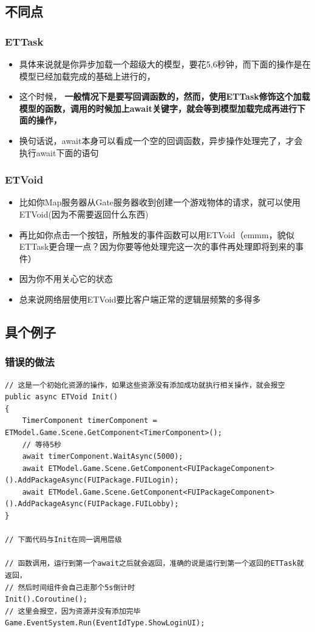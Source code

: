 \documentclass[9pt, b5paper]{article}
\begin{document}
\subsection{不同点}
\label{sec-5-2}
\subsubsection{ETTask}
\label{sec-5-2-1}
\begin{itemize}
\item 具体来说就是你异步加载一个超级大的模型，要花5,6秒钟，而下面的操作是在模型已经加载完成的基础上进行的，
\item 这个时候， \textbf{一般情况下是要写回调函数的，然而，使用ETTask修饰这个加载模型的函数，调用的时候加上await关键字，就会等到模型加载完成再进行下面的操作，}
\item 换句话说，await本身可以看成一个空的回调函数，异步操作处理完了，才会执行await下面的语句
\end{itemize}
\subsubsection{ETVoid}
\label{sec-5-2-2}
\begin{itemize}
\item 比如你Map服务器从Gate服务器收到创建一个游戏物体的请求，就可以使用ETVoid(因为不需要返回什么东西)
\item 再比如你点击一个按钮，所触发的事件函数可以用ETVoid（emmm，貌似ETTask更合理一点？因为你要等他处理完这一次的事件再处理即将到来的事件）
\item 因为你不用关心它的状态
\item 总来说网络层使用ETVoid要比客户端正常的逻辑层频繁的多得多
\end{itemize}
\subsection{具个例子}
\label{sec-5-3}
\subsubsection{错误的做法}
\label{sec-5-3-1}
\begin{verbatim}
// 这是一个初始化资源的操作，如果这些资源没有添加成功就执行相关操作，就会报空
public async ETVoid Init() 
{
	TimerComponent timerComponent = ETModel.Game.Scene.GetComponent<TimerComponent>();
	// 等待5秒
	await timerComponent.WaitAsync(5000);
	await ETModel.Game.Scene.GetComponent<FUIPackageComponent>().AddPackageAsync(FUIPackage.FUILogin);
	await ETModel.Game.Scene.GetComponent<FUIPackageComponent>().AddPackageAsync(FUIPackage.FUILobby);
}

// 下面代码与Init在同一调用层级

// 函数调用，运行到第一个await之后就会返回，准确的说是运行到第一个返回的ETTask就返回，
// 然后时间组件会自己走那个5s倒计时
Init().Coroutine();
// 这里会报空，因为资源并没有添加完毕
Game.EventSystem.Run(EventIdType.ShowLoginUI);
\end{verbatim}
\end{document}

